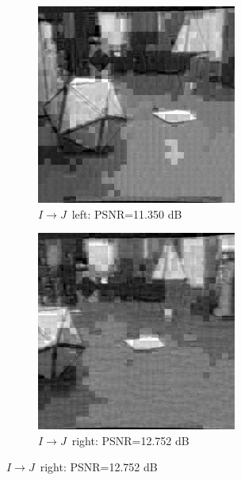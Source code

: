 \documentclass[10pt,twoside,titlepage]{article}
\newcommand{\sysIJ}{\mbox{$I \rightarrow J$}}
\begin{document}
\begin{figure}
    \centering
    \begin{subfigure}{0.5\textwidth}
        \centering
        \includegraphics[width=0.6\linewidth]{img/cart_ij_left.png}
        \caption{\sysIJ\ left: PSNR=11.350 dB}
    \end{subfigure}%
    \begin{subfigure}{0.5\textwidth}
        \centering
        \includegraphics[width=0.6\linewidth]{img/cart_ij_right.png}
        \caption{\sysIJ\ right: PSNR=12.752 dB}
    \end{subfigure}
    \label{fig:cart_ij}


\end{figure}
\end{document}
